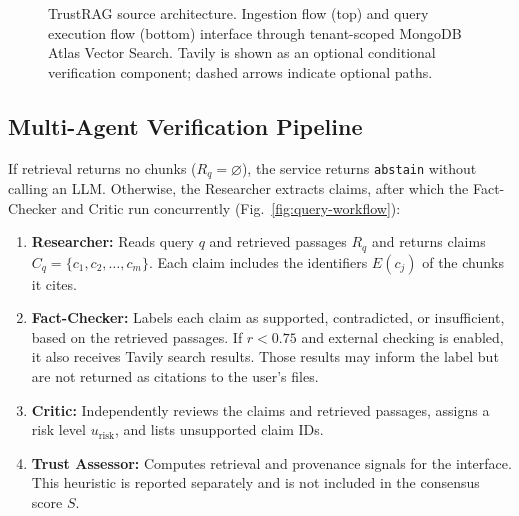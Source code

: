 \documentclass[conference]{IEEEtran}
\newcommand{\TR}{TrustRAG}
\begin{document}
\begin{figure}[t]
\caption{\TR{} source architecture. Ingestion flow (top) and query execution flow (bottom)
interface through tenant-scoped MongoDB Atlas Vector Search. Tavily is shown as an
optional conditional verification component; dashed arrows indicate optional paths.}
\label{fig:architecture}
\end{figure}

\subsection{Multi-Agent Verification Pipeline}
\label{sec:agents}
If retrieval returns no chunks ($R_q = \varnothing$), the service returns
\texttt{abstain} without calling an LLM. Otherwise, the Researcher extracts
claims, after which the Fact-Checker and Critic run concurrently
(Fig.~\ref{fig:query-workflow}):
\begin{enumerate}
  \item \textbf{Researcher:} Reads query $q$ and retrieved passages $R_q$ and
    returns claims $C_q = \{c_1, c_2, \dots, c_m\}$. Each claim includes the
    identifiers $E(c_j)$ of the chunks it cites.
  \item \textbf{Fact-Checker:} Labels each claim as supported, contradicted, or
    insufficient, based on the retrieved passages. If $r < 0.75$ and external
    checking is enabled, it also receives Tavily search results. Those results
    may inform the label but are not returned as citations to the user's files.
  \item \textbf{Critic:} Independently reviews the claims and retrieved passages,
    assigns a risk level $u_{\text{risk}}$, and lists unsupported claim IDs.
  \item \textbf{Trust Assessor:} Computes retrieval and provenance signals for
    the interface. This heuristic is reported separately and is not included in
    the consensus score $S$.
\end{enumerate}
\end{document}
